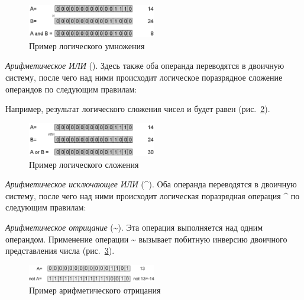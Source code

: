 \begin{figure}[htb]
\begin{center}
\includegraphics[width=0.5\textwidth]{img/ris_2_2}
\caption{Пример логического умножения}
\label{ch02:refDrawing1}
\end{center}
\end{figure}

\emph{Арифметическое ИЛИ} ({\textbar}). Здесь также оба операнда переводятся в двоичную
систему, после чего над ними происходит логическое поразрядное сложение операндов по следующим правилам:


Например, результат логического сложения чисел  и  будет равен  
(рис.~\ref{ch02:refDrawing2}). 

\begin{figure}[htb]
\begin{center}
\includegraphics[width=0.5\textwidth]{img/ris_2_3}
\caption{Пример логического сложения}
\label{ch02:refDrawing2}
\end{center}
\end{figure}

\emph{Арифметическое исключающее ИЛИ} (\^{}). Оба операнда переводятся в двоичную
систему, после чего над ними происходит логическая поразрядная операция \^{} по следующим правилам:


\emph{Арифметическое отрицание} (\~{}). Эта операция выполняется над одним операндом.
Применение операции \~{} вызывает побитную инверсию двоичного представления числа 
(рис.~\ref{ch02:refDrawing3}).

\begin{figure}[htb]
\begin{center}
\includegraphics[width=0.5\textwidth]{img/ris_2_4}
\caption{Пример арифметического отрицания}
\label{ch02:refDrawing3}
\end{center}
\end{figure}

